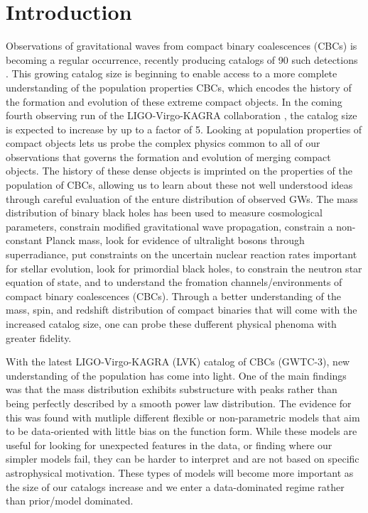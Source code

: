 \section{Introduction} \label{sec:intro}

Observations of gravitational waves from compact binary coalescences (CBCs) is becoming a regular occurrence, 
recently producing catalogs of 90 such detections . This growing catalog size is beginning to enable access to a more complete 
understanding of the population properties CBCs, which encodes the history of the formation and evolution of these extreme compact objects. 
In the coming fourth observing run of the LIGO-Virgo-KAGRA collaboration , the catalog size is expected to increase by up to a factor of 5. 
Looking at population properties of compact objects lets us probe the complex physics common to all of our observations that governs the 
formation and evolution of merging compact objects. The history of these dense objects is imprinted on the properties of the population 
of CBCs, allowing us to learn about these not well understood ideas through careful evaluation of the enture distribution of observed GWs. 
The mass distribution of binary black holes has been used to measure cosmological parameters, constrain modified gravitational wave propagation, 
constrain a non-constant Planck mass, look for evidence of ultralight bosons through superradiance, put constraints on the uncertain nuclear reaction 
rates important for stellar evolution, look for primordial black holes, to constrain the neutron star equation of state, 
and to understand the fromation channels/environments of compact binary coalescences (CBCs). Through a better understanding of the mass, spin, 
and redshift distribution of compact binaries that will come with the increased catalog size, one can probe these dufferent physical phenoma with 
greater fidelity.

With the latest LIGO-Virgo-KAGRA (LVK) catalog of CBCs (GWTC-3), new understanding of the population has come into light. One of the main findings was that 
the mass distribution exhibits substructure with peaks rather than being perfectly described by a smooth power law distribution. The evidence for this was 
found with mutliple different flexible or non-parametric models that aim to be data-oriented with little bias on the function form. While these models are 
useful for looking for unexpected features in the data, or finding where our simpler models fail, they can be harder to interpret and are not based on specific
astrophysical motivation. These types of models will become more important as the size of our catalogs increase and we enter a data-dominated regime rather than
prior/model dominated. 

